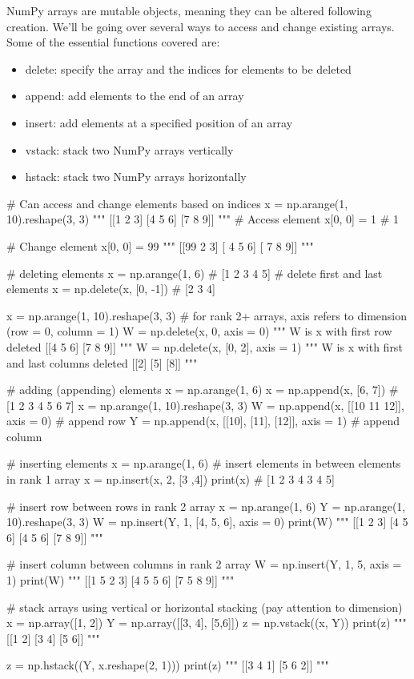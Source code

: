 NumPy arrays are mutable objects, meaning they can be altered following creation. We'll be going over several ways to access and change existing arrays. Some of the essential functions covered are:
\begin{itemize}
	\item delete: specify the array and the indices for elements to be deleted
	\item append: add elements to the end of an array
	\item insert: add elements at a specified position of an array
	\item vstack: stack two NumPy arrays vertically
	\item hstack: stack two NumPy arrays horizontally
\end{itemize}

\begin{python}
	# Can access and change elements based on indices
	x = np.arange(1, 10).reshape(3, 3)
	"""
	[[1 2 3]
	[4 5 6]
	[7 8 9]]
	"""
	# Access element
	x[0, 0] = 1
	# 1
	
	# Change element
	x[0, 0] = 99
	"""
	[[99  2  3]
	[ 4  5  6]
	[ 7  8  9]]
	"""
	
	# deleting elements
	x = np.arange(1, 6)
	# [1 2 3 4 5]
	# delete first and last elements
	x = np.delete(x, [0, -1])
	# [2 3 4]
	
	x = np.arange(1, 10).reshape(3, 3)
	# for rank 2+ arrays, axis refers to dimension (row = 0, column = 1)
	W = np.delete(x, 0, axis = 0)
	"""
	W is x with first row deleted
	[[4 5 6]
	[7 8 9]]
	"""
	W = np.delete(x, [0, 2], axis = 1)
	"""
	W is x with first and last columns deleted
	[[2]
	[5]
	[8]]
	"""
	
	# adding (appending) elements
	x = np.arange(1, 6)
	x = np.append(x, [6, 7])
	# [1 2 3 4 5 6 7]
	x = np.arange(1, 10).reshape(3, 3)
	W = np.append(x, [[10 11 12]], axis = 0) # append row
	Y = np.append(x, [[10], [11], [12]], axis = 1) # append column
	
	# inserting elements
	x = np.arange(1, 6)
	# insert elements in between elements in rank 1 array
	x = np.insert(x, 2, [3 ,4])
	print(x)
	# [1 2 3 4 3 4 5]
	
	# insert row between rows in rank 2 array
	x = np.arange(1, 6)
	Y = np.arange(1, 10).reshape(3, 3)
	W = np.insert(Y, 1, [4, 5, 6], axis = 0)
	print(W)
	"""
	[[1 2 3]
	[4 5 6]
	[4 5 6]
	[7 8 9]]
	"""
	
	# insert column between columns in rank 2 array
	W = np.insert(Y, 1, 5, axis = 1)
	print(W)
	"""
	[[1 5 2 3]
	[4 5 5 6]
	[7 5 8 9]]
	"""
	
	# stack arrays using vertical or horizontal stacking (pay attention to dimension)
	x = np.array([1, 2])
	Y = np.array([[3, 4], [5,6]])
	z = np.vstack((x, Y))
	print(z)
	"""
	[[1 2]
	[3 4]
	[5 6]]
	"""
	
	z = np.hstack((Y, x.reshape(2, 1)))
	print(z)
	"""
	[[3 4 1]
	[5 6 2]]
	"""
\end{python}